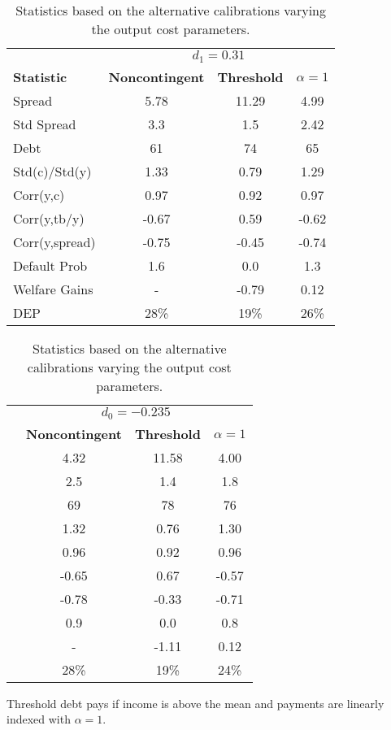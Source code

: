 \begin{table}[!hbtp]\centering\small 
\caption{Statistics based on the alternative calibrations varying the output cost parameters.} \label{table:simulations_sensitivity}
\begin{tabular}{@{}lccc@{}}\toprule
  & \multicolumn{3}{c}{$d_1=0.31$} \\\cmidrule{2-4}
\textbf{Statistic} & \textbf{Noncontingent} & \textbf{Threshold} & $\alpha = 1$\\\midrule
Spread                   & 5.78            & 11.29            & 4.99            \\
Std Spread               & 3.3            & 1.5            & 2.42            \\
Debt                     & 61           & 74           & 65           \\
Std(c)/Std(y)            & 1.33            & 0.79           & 1.29           \\
Corr(y,c)                & 0.97           & 0.92           & 0.97           \\
Corr(y,tb/y)             & -0.67          & 0.59           & -0.62          \\
Corr(y,spread)           & -0.75        & -0.45           & -0.74          \\
Default Prob             & 1.6            & 0.0            & 1.3            \\
Welfare Gains            & -              & -0.79           & 0.12           \\
DEP				      & 28\% 			& 19\% 			& 26\%                  \\
  \bottomrule
\end{tabular}%
\begin{tabular}{@{}lccc@{}}\toprule
  & \multicolumn{3}{c}{$d_0=-0.235$} \\\cmidrule{2-4}
  & \textbf{Noncontingent} & \textbf{Threshold} & $\alpha = 1$ \\\midrule
& 4.32            & 11.58           & 4.00            \\
& 2.5            & 1.4            & 1.8            \\
& 69           & 78           & 76           \\
& 1.32           & 0.76           & 1.30           \\
& 0.96           & 0.92           & 0.96           \\
& -0.65          & 0.67           & -0.57          \\
& -0.78          & -0.33          & -0.71           \\
& 0.9            & 0.0            & 0.8            \\
& -              & -1.11          & 0.12           \\
& 28\%         & 19\%             & 24\%             \\
\bottomrule
\end{tabular}
\begin{tablenotes1}
  Threshold debt pays if income is above the mean and payments are linearly indexed with $\alpha = 1$.
\end{tablenotes1}
\end{table}

